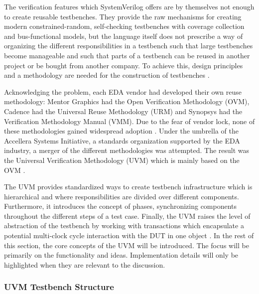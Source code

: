 \documentclass[11pt,a4paper]{report}
\begin{document}
The verification features which SystemVerilog offers are by themselves not enough to create reusable testbenches. They provide
the raw mechanisms for creating modern constrained-random, self-checking testbenches with coverage collection and
bus-functional models, but the language itself does not prescribe a way of organizing the different responsibilities
in a testbench such that large testbenches become manageable and such that parts of a testbench can be reused in
another project or be bought from another company. To achieve this, design principles and a methodology are needed for
the construction of testbenches \cite[Sec. 9.2]{flake2020a}.

Acknowledging the problem, each EDA vendor had developed their own reuse methodology: Mentor Graphics had the Open
Verification Methodology (OVM), Cadence had the Universal Reuse Methodology (URM) and Synopsys had the Verification
Methodology Manual (VMM). Due to the fear of vendor lock, none of these methodologies gained widespread adoption
\cite[ch. 4.1]{mehta2018asic}. Under the umbrella of the Accellera Systems Initiative, a standards organization
supported by the EDA industry, a merger of the different methodologies was attempted. The result was the Universal
Verification Methodology (UVM) which is mainly based on the OVM \cite[ch. 4.1]{mehta2018asic}.

The UVM provides standardized ways to create testbench infrastructure which is hierarchical and where
responsibilities are divided over different components. Furthermore, it introduces the concept of phases,
synchronizing components throughout the different steps of a test case. Finally, the UVM raises the level of
abstraction of the testbench by working with transactions which encapsulate a potential multi-clock cycle interaction
with the DUT in one object \cite[ch. 4.1]{mehta2018asic}. In the rest of this section, the core concepts of the UVM
will be introduced. The focus will be primarily on the functionality and ideas. Implementation details will only be
highlighted when they are relevant to the discussion.

\subsubsection{UVM Testbench Structure} %
\end{document}
